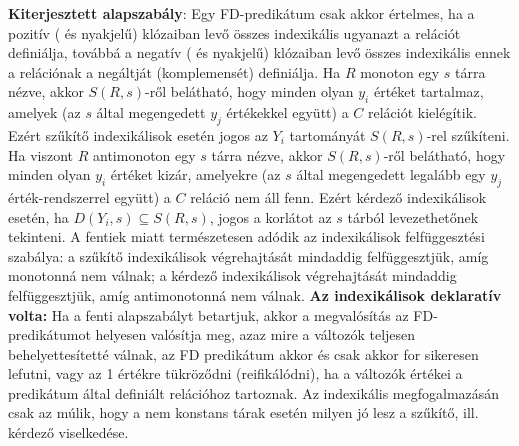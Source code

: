 {\bf Kiterjesztett alapszabály}: Egy FD-predikátum csak akkor
értelmes, ha a pozitív (\cd{+:} és  nyakjelű) klózaiban levő összes
indexikális ugyanazt a relációt definiálja, továbbá a negatív (\cd{-:} és
 nyakjelű) klózaiban levő összes indexikális ennek a relációnak a
negáltját (komplemensét) definiálja.
\br
Ha $R$ monoton egy $s$ tárra nézve, akkor $S(R,s)$-ről belátható,
hogy minden olyan $y_i$ értéket tartalmaz, amelyek (az $s$ által
megengedett $y_j$ értékekkel együtt) a $C$ relációt
kielégítik. Ezért szűkítő indexikálisok esetén jogos az $Y_i$
tartományát $S(R,s)$-rel szűkíteni. Ha viszont $R$ antimonoton egy $s$ tárra
nézve, akkor $S(R,s)$-ről belátható, hogy minden olyan $y_i$ értéket kizár,
amelyekre (az $s$ által megengedett legalább egy $y_j$ érték-rendszerrel együtt)
a $C$ reláció nem áll fenn. Ezért kérdező indexikálisok esetén, ha $D(Y_i,s)
\subseteq S(R,s)$, jogos a korlátot az $s$ tárból levezethetőnek
tekinteni. A fentiek miatt természetesen adódik az indexikálisok
felfüggesztési szabálya: a szűkítő indexikálisok végrehajtását
mindaddig felfüggesztjük, amíg monotonná nem válnak; a kérdező
indexikálisok végrehajtását mindaddig felfüggesztjük, amíg
antimonotonná nem válnak.
\br
{\bf Az indexikálisok deklaratív volta:} Ha a fenti alapszabályt
betartjuk, akkor a \clpfd megvalósítás az FD-predikátumot helyesen
valósítja meg, azaz mire a változók teljesen behelyettesítetté
válnak, az FD predikátum akkor és csak akkor for sikeresen lefutni, vagy
az 1 értékre tükröződni (reifikálódni), ha a változók értékei a
predikátum által definiált relációhoz tartoznak. Az indexikális
megfogalmazásán csak az múlik, hogy a nem konstans tárak esetén milyen
jó lesz a szűkítő, ill. kérdező viselkedése.
